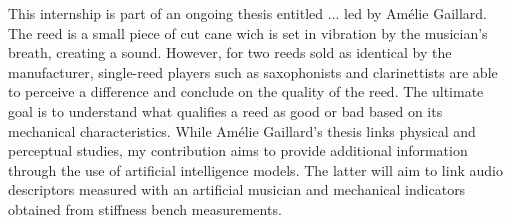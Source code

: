 

This internship is part of an ongoing thesis entitled ... led by Amélie Gaillard. The reed is a small piece of cut cane wich is set in vibration by the musician's breath, creating a sound. However, for two reeds sold as identical by the manufacturer, single-reed players such as saxophonists and clarinettists are able to perceive a difference and conclude on the quality of the reed. The ultimate goal is to understand what qualifies a reed as good or bad based on its mechanical characteristics. While Amélie Gaillard's thesis links physical and perceptual studies, my contribution aims to provide additional information through the use of artificial intelligence models. The latter will aim to link audio descriptors measured with an artificial musician and mechanical indicators obtained from stiffness bench measurements. 